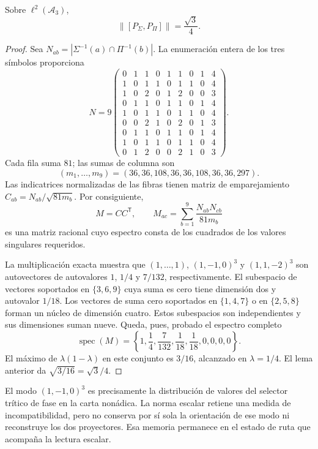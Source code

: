 \begin{proposition}
Sobre \(\ell^2(\mathcal A_3)\),
\begin{equation}
 \|[P_\Sigma,P_\Pi]\|=\frac{\sqrt3}{4}.
 \label{x_reciprocidad:eq:el-prefactor}
\end{equation}
\end{proposition}
\begin{proof}
Sea \(N_{ab}=|\Sigma^{-1}(a)\cap\Pi^{-1}(b)|\). La enumeración entera
de los tres símbolos proporciona
\[
 N=9\begin{pmatrix}
 0&1&1&0&1&1&0&1&4\\
 1&0&1&1&0&1&1&0&4\\
 1&0&2&0&1&2&0&0&3\\
 0&1&1&0&1&1&0&1&4\\
 1&0&1&1&0&1&1&0&4\\
 0&0&2&1&0&2&0&1&3\\
 0&1&1&0&1&1&0&1&4\\
 1&0&1&1&0&1&1&0&4\\
 0&1&2&0&0&2&1&0&3
 \end{pmatrix}.
\]
Cada fila suma \(81\); las sumas de columna son
\[
 (m_1,\ldots,m_9)=(36,36,108,36,36,108,36,36,297).
\]
Las indicatrices normalizadas de las fibras tienen matriz de
emparejamiento \(C_{ab}=N_{ab}/\sqrt{81m_b}\). Por consiguiente,
\[
 M=CC^{\mathsf T},\qquad
 M_{ac}=\sum_{b=1}^9\frac{N_{ab}N_{cb}}{81m_b}
\]
es una matriz racional cuyo espectro consta de los cuadrados de los
valores singulares requeridos.

La multiplicación exacta muestra que \((1,\ldots,1)\),
\((1,-1,0)^3\) y \((1,1,-2)^3\) son autovectores de autovalores
\(1\), \(1/4\) y \(7/132\), respectivamente. El subespacio de
vectores soportados en \(\{3,6,9\}\) cuya suma es cero tiene dimensión
dos y autovalor \(1/18\). Los vectores de suma cero soportados en
\(\{1,4,7\}\) o en \(\{2,5,8\}\) forman un núcleo de dimensión
cuatro. Estos subespacios son independientes y sus dimensiones suman
nueve. Queda, pues, probado el espectro completo
\[
 \operatorname{spec}(M)=
 \left\{1,\frac14,\frac7{132},\frac1{18},\frac1{18},0,0,0,0\right\}.
\]
El máximo de \(\lambda(1-\lambda)\) en este conjunto es \(3/16\),
alcanzado en \(\lambda=1/4\). El lema anterior da
\(\sqrt{3/16}=\sqrt3/4\).
\end{proof}

El modo \((1,-1,0)^3\) es precisamente la distribución de valores del
selector trítico de fase en la carta nonádica. La norma escalar retiene
una medida de incompatibilidad, pero no conserva por sí sola la
orientación de ese modo ni reconstruye los dos proyectores. Esa memoria
permanece en el estado de ruta que acompaña la lectura escalar.

